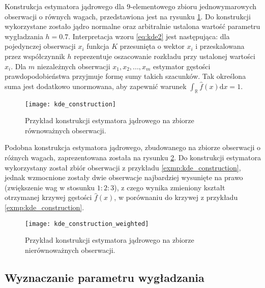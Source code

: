\begin{exmp} \label{exmp:kde_construction}
Konstrukcja estymatora jądrowego dla $9$-elementowego zbioru jednowymarowych obserwacji o równych wagach, przedstawiona jest na rysunku \ref{fig:kde_construction}. Do konstrukcji wykorzystane zostało jądro normalne oraz arbitralnie ustalona wartość parametru wygładzania $h = 0.7$. Interpretacja wzoru \eqref{eq:kde2} jest następująca: dla pojedynczej obserwacji $x_i$ funkcja $K$ przesunięta o wektor $x_i$ i przeskalowana przez współczynnik $h$ reprezentuje oszacowanie rozkładu przy ustalonej wartości $x_i$. Dla $m$ niezależnych obserwacji $x_1, x_2, ..., x_m$ estymator gęstości prawdopodobieństwa przyjmuje formę sumy takich szacunków. Tak określona suma jest dodatkowo unormowana, aby zapewnić warunek $\int_\mathbb{R} \hat{f}(x) \mathrm{d}x = 1$.
\begin{figure}[H]
    \centering
    \texttt{[image: kde\_construction]}
    \vspace{-0.5cm} 
    \caption{Przykład konstrukcji estymatora jądrowego na zbiorze równoważnych obserwacji.}
    \label{fig:kde_construction}
\end{figure}
\end{exmp}

\begin{exmp}
Podobna konstrukcja estymatora jądrowego, zbudowanego na zbiorze obserwacji o różnych wagach, zaprezentowana została na rysunku \ref{fig:kde_construction_weighted}. Do konstrukcji estymatora wykorzystany został zbiór obserwacji z przykładu \ref{exmp:kde_construction}, jednak wzmocnione zostały dwie obserwacje najbardziej wysunięte na prawo (zwiększenie wag w stosunku $1:2:3$), z czego wynika zmieniony kształt otrzymanej krzywej gęstości $\hat{f}(x)$, w porównaniu do krzywej z przykładu \ref{exmp:kde_construction}.

\begin{figure}[H]
    \centering
    \texttt{[image: kde\_construction\_weighted]}
    \vspace{-0.5cm} 
    \caption{Przykład konstrukcji estymatora jądrowego na zbiorze nierównoważnych obserwacji.}
    \label{fig:kde_construction_weighted}
\end{figure}
\end{exmp}

\subsection{Wyznaczanie parametru wygładzania} \label{subsec:bandwidth_selection}

